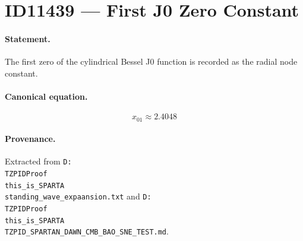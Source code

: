 \section*{ID11439 --- First J0 Zero Constant}

\paragraph{Statement.}
The first zero of the cylindrical Bessel J0 function is recorded as the radial node constant.

\paragraph{Canonical equation.}
\[
x_{01}\approx2.4048
\]

\paragraph{Provenance.}
Extracted from \texttt{D:\\TZPIDProof\\this\_is\_SPARTA\\standing\_wave\_expaansion.txt} and \texttt{D:\\TZPIDProof\\this\_is\_SPARTA\\TZPID\_SPARTAN\_DAWN\_CMB\_BAO\_SNE\_TEST.md}.
